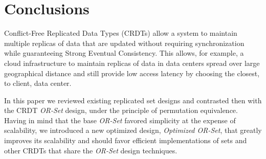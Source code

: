 \documentclass[a4paper]{article}
\begin{document}
\section{Conclusions}

Conflict-Free Replicated Data Types (CRDTs) allow a system to maintain
multiple replicas of data that are updated without requiring synchronization
while guaranteeing Strong Eventual Consistency.  This allows, for example, a
cloud infrastructure to maintain replicas of data in data centers spread over
large geographical distance and still provide low access latency by choosing
the closest, to client, data center.

In this paper we reviewed existing replicated set designs and contrasted then
with the CRDT \emph{OR-Set} design, under the principle of permutation
equivalence. Having in mind that the base \emph{OR-Set} favored simplicity at the
expense of scalability, we introduced a new optimized design, \emph{Optimized
OR-Set}, that greatly improves its scalability and should favor efficient
implementations of sets and other CRDTs that share the \emph{OR-Set} design
techniques. 


{
\footnotesize
\newcommand{\textcommabelow}[1]{\c{#1}}


}
\end{document}
